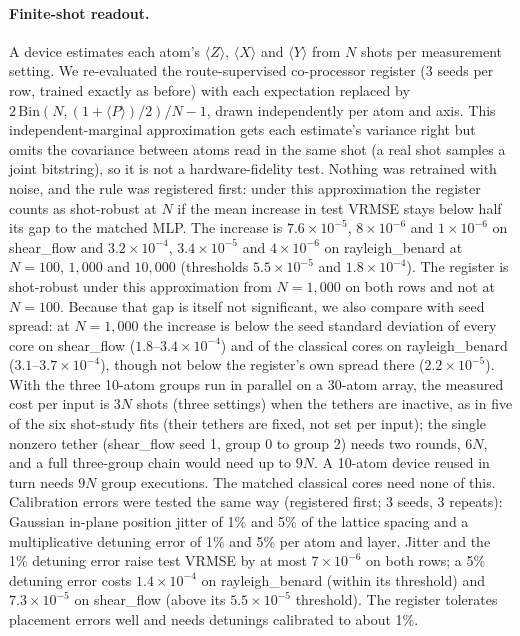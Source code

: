 \documentclass{article}
\begin{document}
\paragraph{Finite-shot readout.} A device estimates each atom's $\langle Z\rangle$, $\langle X\rangle$ and
$\langle Y\rangle$ from $N$ shots per measurement setting. We re-evaluated the route-supervised co-processor register
(3 seeds per row, trained exactly as before) with each expectation replaced by $2\,\mathrm{Bin}(N,(1+\langle P\rangle)/2)/N-1$,
drawn independently per atom and axis. This independent-marginal approximation gets each estimate's variance right but
omits the covariance between atoms read in the same shot (a real shot samples a joint bitstring), so it is not a
hardware-fidelity test. Nothing was retrained with noise, and the rule was registered first: under this approximation the register counts as shot-robust at $N$ if the
mean increase in test VRMSE stays below half its gap to the matched MLP. The increase is $7.6\times10^{-5}$,
$8\times10^{-6}$ and $1\times10^{-6}$ on shear\_flow and $3.2\times10^{-4}$, $3.4\times10^{-5}$ and $4\times10^{-6}$ on
rayleigh\_benard at $N=100$, $1{,}000$ and $10{,}000$ (thresholds $5.5\times10^{-5}$ and $1.8\times10^{-4}$). The register is
shot-robust under this approximation from $N=1{,}000$ on both rows and not at $N=100$. Because that gap is itself not significant, we also
compare with seed spread: at $N=1{,}000$ the increase is below the seed standard deviation of every core on
shear\_flow ($1.8$--$3.4\times10^{-4}$) and of the classical cores on rayleigh\_benard ($3.1$--$3.7\times10^{-4}$), though not
below the register's own spread there ($2.2\times10^{-5}$). With the three 10-atom groups run in parallel on a 30-atom
array, the measured cost per input is $3N$ shots (three settings) when the tethers are inactive, as in five of the six
shot-study fits (their tethers are fixed, not set per input); the single nonzero tether (shear\_flow seed 1, group 0 to
group 2) needs two rounds, $6N$, and a full three-group chain would need up to $9N$. A 10-atom device reused in turn needs
$9N$ group executions. The matched classical cores need none of this.
Calibration errors were tested the same way (registered first; 3 seeds, 3 repeats): Gaussian in-plane position jitter
of 1\% and 5\% of the lattice spacing and a multiplicative detuning error of 1\% and 5\% per atom and layer. Jitter and
the 1\% detuning error raise test VRMSE by at most $7\times10^{-6}$ on both rows; a 5\% detuning error costs
$1.4\times10^{-4}$ on rayleigh\_benard (within its threshold) and $7.3\times10^{-5}$ on shear\_flow (above its
$5.5\times10^{-5}$ threshold). The register tolerates placement errors well and needs detunings calibrated to about 1\%.
\end{document}
